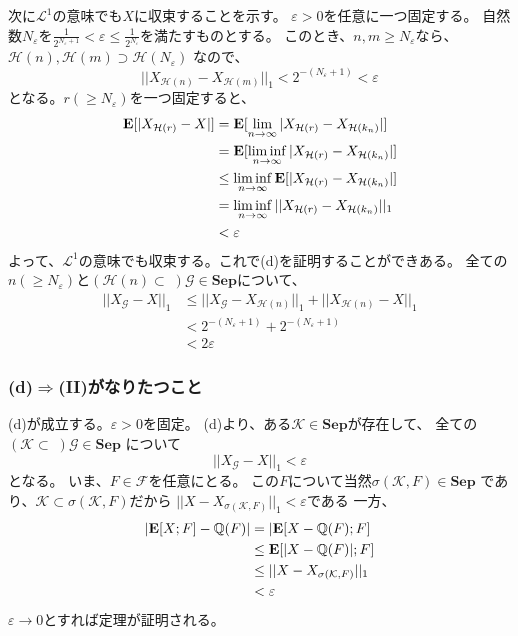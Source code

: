       次に$\mathcal{L}^1$の意味でも$X$に収束することを示す。
      $\varepsilon >0$を任意に一つ固定する。
      自然数$N_{\varepsilon}$を$\displaystyle{\frac{1}{2^{N_{\varepsilon}+1}} < \varepsilon \leq \frac{1}{2^{N_{\varepsilon}}}}$を満たすものとする。
      このとき、$n,m \ge N_{\varepsilon}$なら、
      $\mathcal{H}(n),\mathcal{H}(m) \supset \mathcal{H}(N_{\varepsilon})$
      なので、
      \[
        ||X_{\mathcal{H}(n)} - X_{\mathcal{H}(m)}||_1 < 2^{-(N_{\varepsilon}+1)} < \varepsilon
      \]
      となる。$r (\ge N_{\varepsilon})$を一つ固定すると、
      \begin{align*}
        {\mathbf{E}}[|X_{\mathcal{H}(r)} - X|] &= {\mathbf{E}}[\lim_{n \to \infty}|X_{\mathcal{H}(r)} - X_{\mathcal{H}(k_n)}|]\\
        &= {\mathbf{E}}[\liminf_{n \to \infty}|X_{\mathcal{H}(r)} - X_{\mathcal{H}(k_n)}|]\\
        &\leq \liminf_{n \to \infty}{\mathbf{E}}[|X_{\mathcal{H}(r)} - X_{\mathcal{H}(k_n)}|]\\
        &= \liminf_{n \to \infty}||X_{\mathcal{H}(r)} - X_{\mathcal{H}(k_n)}||_1 \\
        &< \varepsilon
      \end{align*}
      よって、$\mathcal{L}^1$の意味でも収束する。これで(d)を証明することができある。
      全ての$n(\ge N_{\varepsilon})$と$(\mathcal{H}(n) \subset \;)\mathcal{G} \in \mathbf{Sep}$について、
      \begin{align*}
        ||X_{\mathcal{G}} - X||_1 &\leq ||X_{\mathcal{G}} - X_{\mathcal{H}(n)}||_1 + ||X_{\mathcal{H}(n)} - X||_1\\
        &< 2^{-(N_{\varepsilon} + 1)} + 2^{-(N_{\varepsilon} + 1)}\\
        &< 2\varepsilon
      \end{align*}
    \subsubsection{(d)$\Rightarrow$(II)がなりたつこと}
      (d)が成立する。$\varepsilon > 0 $を固定。
      (d)より、ある$\mathcal{K} \in \mathbf{Sep}$が存在して、
      全ての$(\mathcal{K} \subset \;)\mathcal{G} \in \mathbf{Sep}$
      について
      \[||X_{\mathcal{G}} - X||_1 < \varepsilon\]
      となる。
      いま、$F \in \mathcal{F}$を任意にとる。
      この$F$について当然$\sigma(\mathcal{K},F) \in \mathbf{Sep}$
      であり、$\mathcal{K} \subset \sigma(\mathcal{K},F)$だから
      $||X - X_{\sigma(\mathcal{K},F)}||_1 < \varepsilon $である
      一方、
      \begin{align*}
        |{\mathbf{E}}[X;F] - \mathbb{Q}(F)| &= |{\mathbf{E}}[X - \mathbb{Q}(F) ; F]\\
        &\leq {\mathbf{E}}[|X - \mathbb{Q}(F)| ; F]\\
        &\leq ||X - X_{\sigma(\mathcal{K},F)}||_1\\
        &< \varepsilon
      \end{align*}
      $\varepsilon \rightarrow 0$とすれば定理が証明される。
